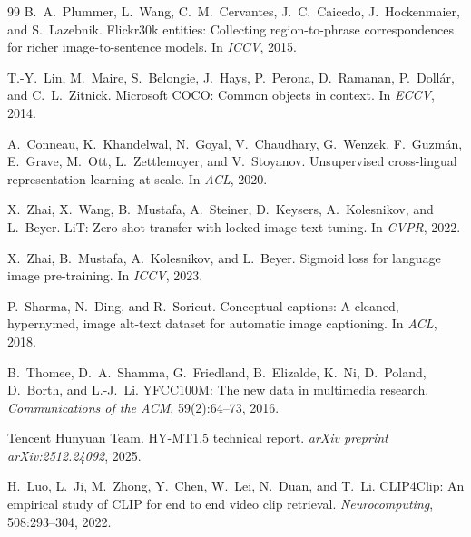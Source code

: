 \documentclass[10pt,leqno]{amsart}
\begin{document}
\begin{thebibliography}{99}
B.~A.~Plummer, L.~Wang, C.~M.~Cervantes, J.~C.~Caicedo, J.~Hockenmaier, and S.~Lazebnik.
\newblock Flickr30k entities: Collecting region-to-phrase correspondences for richer image-to-sentence models.
\newblock In \textit{ICCV}, 2015.

T.-Y.~Lin, M.~Maire, S.~Belongie, J.~Hays, P.~Perona, D.~Ramanan, P.~Dollár, and C.~L.~Zitnick.
\newblock Microsoft COCO: Common objects in context.
\newblock In \textit{ECCV}, 2014.

A.~Conneau, K.~Khandelwal, N.~Goyal, V.~Chaudhary, G.~Wenzek, F.~Guzmán, E.~Grave, M.~Ott, L.~Zettlemoyer, and V.~Stoyanov.
\newblock Unsupervised cross-lingual representation learning at scale.
\newblock In \textit{ACL}, 2020.

X.~Zhai, X.~Wang, B.~Mustafa, A.~Steiner, D.~Keysers, A.~Kolesnikov, and L.~Beyer.
\newblock LiT: Zero-shot transfer with locked-image text tuning.
\newblock In \textit{CVPR}, 2022.

X.~Zhai, B.~Mustafa, A.~Kolesnikov, and L.~Beyer.
\newblock Sigmoid loss for language image pre-training.
\newblock In \textit{ICCV}, 2023.

P.~Sharma, N.~Ding, and R.~Soricut.
\newblock Conceptual captions: A cleaned, hypernymed, image alt-text dataset for
  automatic image captioning.
\newblock In \textit{ACL}, 2018.

B.~Thomee, D.~A.~Shamma, G.~Friedland, B.~Elizalde, K.~Ni, D.~Poland,
  D.~Borth, and L.-J.~Li.
\newblock YFCC100M: The new data in multimedia research.
\newblock \textit{Communications of the ACM}, 59(2):64--73, 2016.

Tencent Hunyuan Team.
\newblock HY-MT1.5 technical report.
\newblock \textit{arXiv preprint arXiv:2512.24092}, 2025.

H.~Luo, L.~Ji, M.~Zhong, Y.~Chen, W.~Lei, N.~Duan, and T.~Li.
\newblock CLIP4Clip: An empirical study of CLIP for end to end video clip retrieval.
\newblock \textit{Neurocomputing}, 508:293--304, 2022.


\end{thebibliography}
\end{document}
